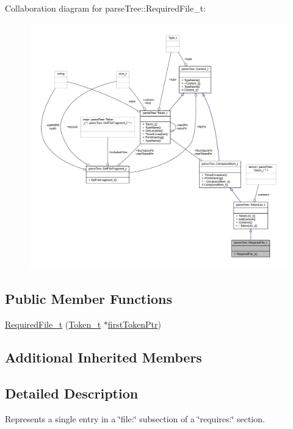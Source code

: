 Collaboration diagram for parse\+Tree\+:\+:Required\+File\+\_\+t\+:
\nopagebreak
\begin{figure}[H]
\begin{center}
\leavevmode
\includegraphics[width=350pt]{structparse_tree_1_1_required_file__t__coll__graph}
\end{center}
\end{figure}
\subsection*{Public Member Functions}
\begin{DoxyCompactItemize}
\item 
\hyperlink{structparse_tree_1_1_required_file__t_a395b5900f87f1f7470800fd2a4d6ac37}{Required\+File\+\_\+t} (\hyperlink{structparse_tree_1_1_token__t}{Token\+\_\+t} $\ast$\hyperlink{structparse_tree_1_1_compound_item__t_a587020c943e760cb0152dd8cd31e21ef}{first\+Token\+Ptr})
\end{DoxyCompactItemize}
\subsection*{Additional Inherited Members}


\subsection{Detailed Description}
Represents a single entry in a \char`\"{}file\+:\char`\"{} subsection of a \char`\"{}requires\+:\char`\"{} section. 

